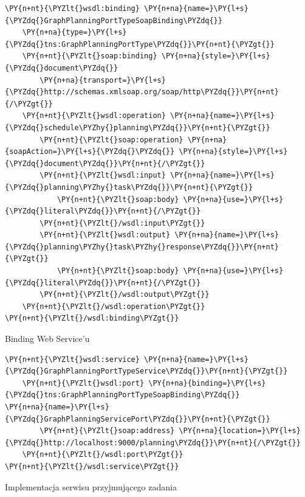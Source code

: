 \begin{program}
\begin{code}
\begin{Verbatim}[commandchars=\\\{\}]
\PY{n+nt}{\PYZlt{}wsdl:binding} \PY{n+na}{name=}\PY{l+s}{\PYZdq{}GraphPlanningPortTypeSoapBinding\PYZdq{}} 
	\PY{n+na}{type=}\PY{l+s}{\PYZdq{}tns:GraphPlanningPortType\PYZdq{}}\PY{n+nt}{\PYZgt{}}
	\PY{n+nt}{\PYZlt{}soap:binding} \PY{n+na}{style=}\PY{l+s}{\PYZdq{}document\PYZdq{}} 
		\PY{n+na}{transport=}\PY{l+s}{\PYZdq{}http://schemas.xmlsoap.org/soap/http\PYZdq{}}\PY{n+nt}{/\PYZgt{}}
	\PY{n+nt}{\PYZlt{}wsdl:operation} \PY{n+na}{name=}\PY{l+s}{\PYZdq{}schedule\PYZhy{}planning\PYZdq{}}\PY{n+nt}{\PYZgt{}}
		\PY{n+nt}{\PYZlt{}soap:operation} \PY{n+na}{soapAction=}\PY{l+s}{\PYZdq{}\PYZdq{}} \PY{n+na}{style=}\PY{l+s}{\PYZdq{}document\PYZdq{}}\PY{n+nt}{/\PYZgt{}}
		\PY{n+nt}{\PYZlt{}wsdl:input} \PY{n+na}{name=}\PY{l+s}{\PYZdq{}planning\PYZhy{}task\PYZdq{}}\PY{n+nt}{\PYZgt{}}
			\PY{n+nt}{\PYZlt{}soap:body} \PY{n+na}{use=}\PY{l+s}{\PYZdq{}literal\PYZdq{}}\PY{n+nt}{/\PYZgt{}}
		\PY{n+nt}{\PYZlt{}/wsdl:input\PYZgt{}}
		\PY{n+nt}{\PYZlt{}wsdl:output} \PY{n+na}{name=}\PY{l+s}{\PYZdq{}planning\PYZhy{}task\PYZhy{}response\PYZdq{}}\PY{n+nt}{\PYZgt{}}
			\PY{n+nt}{\PYZlt{}soap:body} \PY{n+na}{use=}\PY{l+s}{\PYZdq{}literal\PYZdq{}}\PY{n+nt}{/\PYZgt{}}
		\PY{n+nt}{\PYZlt{}/wsdl:output\PYZgt{}}
	\PY{n+nt}{\PYZlt{}/wsdl:operation\PYZgt{}}
\PY{n+nt}{\PYZlt{}/wsdl:binding\PYZgt{}}
\end{Verbatim}
\end{code}
\caption{Binding Web Service'u}
\end{program}



\begin{program}
\begin{code}
\begin{Verbatim}[commandchars=\\\{\}]
\PY{n+nt}{\PYZlt{}wsdl:service} \PY{n+na}{name=}\PY{l+s}{\PYZdq{}GraphPlanningPortTypeService\PYZdq{}}\PY{n+nt}{\PYZgt{}}
	\PY{n+nt}{\PYZlt{}wsdl:port} \PY{n+na}{binding=}\PY{l+s}{\PYZdq{}tns:GraphPlanningPortTypeSoapBinding\PYZdq{}}
\PY{n+na}{name=}\PY{l+s}{\PYZdq{}GraphPlanningServicePort\PYZdq{}}\PY{n+nt}{\PYZgt{}}
		\PY{n+nt}{\PYZlt{}soap:address} \PY{n+na}{location=}\PY{l+s}{\PYZdq{}http://localhost:9000/planning\PYZdq{}}\PY{n+nt}{/\PYZgt{}}
	\PY{n+nt}{\PYZlt{}/wsdl:port\PYZgt{}}
\PY{n+nt}{\PYZlt{}/wsdl:service\PYZgt{}}
\end{Verbatim}
\end{code}
\caption{Implementacja serwisu przyjmującego zadania}
\end{program}


